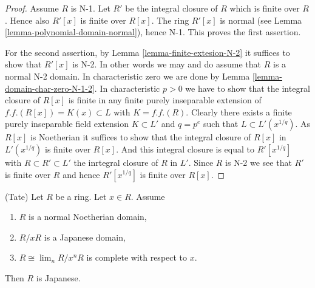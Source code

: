 \begin{proof}
Assume $R$ is N-1. Let $R'$ be the integral closure of $R$
which is finite over $R$. Hence also $R'[x]$ is finite over
$R[x]$. The ring $R'[x]$ is normal (see
Lemma \ref{lemma-polynomial-domain-normal}), hence N-1.
This proves the first assertion.

\medskip\noindent
For the second assertion, by Lemma \ref{lemma-finite-extesion-N-2}
it suffices to show that $R'[x]$ is N-2. In other words we may
and do assume that $R$ is a normal N-2 domain. In characteristic zero
we are done by Lemma \ref{lemma-domain-char-zero-N-1-2}.
In characteristic $p > 0$ we have to show that the integral
closure of $R[x]$ is finite in any finite purely inseparable extension
of $f.f.(R[x]) = K(x) \subset L$ with $K = f.f.(R)$. Clearly there
exists a finite purely inseparable field extension $K \subset L'$
and $q = p^e$ such that $L \subset L'(x^{1/q})$. As $R[x]$ is
Noetherian it suffices to show that the integral closure of $R[x]$
in $L'(x^{1/q})$ is finite over $R[x]$. And this integral closure
is equal to $R'[x^{1/q}]$ with $R \subset R' \subset L'$ the inrtegral
closure of $R$ in $L'$.
Since $R$ is N-2 we see that $R'$ is finite over $R$ and hence
$R'[x^{1/q}]$ is finite over $R[x]$.
\end{proof}

\begin{lemma}
\label{lemma-tate-japanese}
(Tate)
Let $R$ be a ring.
Let $x \in R$.
Assume
\begin{enumerate}
\item $R$ is a normal Noetherian domain,
\item $R/xR$ is a Japanese domain,
\item $R \cong \lim_n R/x^nR$ is complete with respect to $x$.
\end{enumerate}
Then $R$ is Japanese.
\end{lemma}

